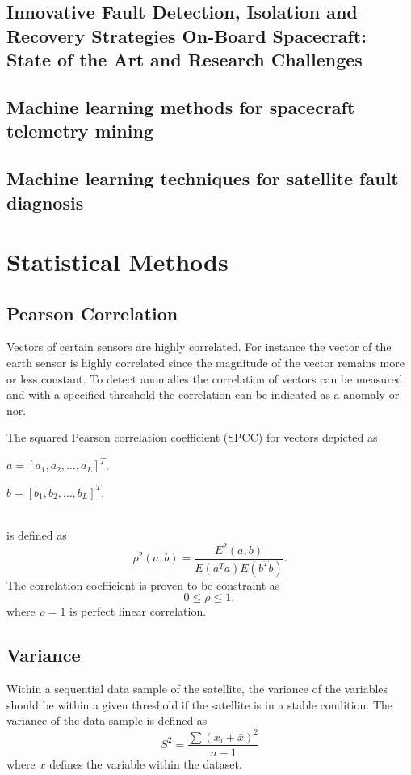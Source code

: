 \subsection{Innovative Fault Detection, Isolation and Recovery Strategies On-Board Spacecraft: State of the Art and Research Challenges}
\cite{wander2013innovative}

\subsection{Machine learning methods for spacecraft telemetry mining}
\cite{ibrahim2018machine}

\subsection{Machine learning techniques for satellite fault diagnosis}
\cite{ibrahim2020machine}

\section{Statistical Methods}
\subsection{Pearson Correlation}
Vectors of certain sensors are highly correlated. For instance the vector of the earth sensor is highly correlated since the magnitude of the vector remains more or less constant. To detect anomalies the correlation of vectors can be measured and with a specified threshold the correlation can be indicated as a anomaly or nor.

The squared Pearson correlation coefficient (SPCC) for vectors depicted as
\linebreak
\\
\centerline{$a = [a_1, a_2, \ldots, a_L]^T,$}
\linebreak
\centerline{$b = [b_1, b_2, \ldots, b_L]^T,$}
\\
is defined as \cite{benesty2009pearson}
\begin{equation}
	\rho^2 (a,b) = \frac{E^2 (a,b)}{E(a^Ta)E(b^Tb)}.
\end{equation}
The correlation coefficient is proven to be constraint as
\begin{equation}
	0 \leq \rho \leq 1,
\end{equation}
where $\rho = 1$ is perfect linear correlation. 

\subsection{Variance}
Within a sequential data sample of the satellite, the variance of the variables should be within a given threshold if the satellite is in a stable condition. The variance of the data sample is defined as 
\begin{equation}
	S^2 = \frac{\sum(x_i + \bar{x})^2}{n-1}
\end{equation}
where $x$ defines the variable within the dataset.

